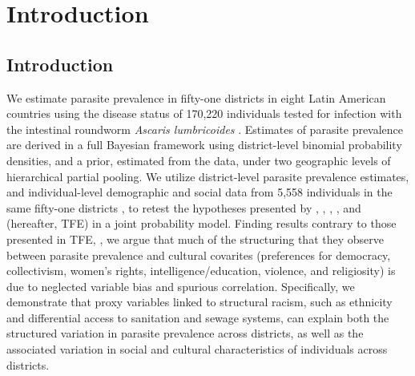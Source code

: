 \documentclass[12pt]{article}
\begin{document}
\clearpage
\linenumbers
\section{Introduction}
\subsection{Introduction}
	We estimate parasite prevalence in fifty-one districts in eight Latin American countries using the disease status of 170,220 individuals tested for infection with the intestinal roundworm \textit{Ascaris lumbricoides} \citep{Hurlimann2011}. Estimates of parasite prevalence are derived in a full Bayesian framework using district-level binomial probability densities, and a prior, estimated from the data, under two geographic levels of hierarchical partial pooling. We utilize district-level parasite prevalence estimates, and individual-level demographic and social data from 5,558 individuals in the same fifty-one districts \citep{LB2008}, to retest the hypotheses presented by \citet{Fincher2012}, \citet{Thornhill2011}, \citet{Eppig2010}, \citet{Thornhill2009}, and \citet{Fincher2008} (hereafter, TFE) in a joint probability model.  Finding results contrary to those presented in TFE, \citep[as have other researchers attempting to replicate their findings, see][]{hackman2013fast}, we argue that much of the structuring that they observe between parasite prevalence and cultural covarites (preferences for democracy, collectivism, women's rights, intelligence/education, violence, and religiosity) is due to neglected variable bias and spurious correlation.  Specifically, we demonstrate that proxy variables linked to structural racism, such as ethnicity and differential access to sanitation and sewage systems, can explain both the structured variation in parasite prevalence across districts, as well as the associated variation in social and cultural characteristics of individuals across districts.
\end{document}
